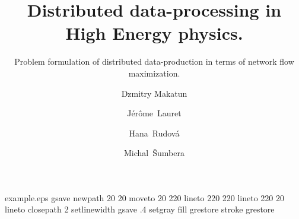 %
%
%
%
%
%
\begin{filecontents*}{example.eps}
gsave
newpath
  20 20 moveto
  20 220 lineto
  220 220 lineto
  220 20 lineto
closepath
2 setlinewidth
gsave
  .4 setgray fill
grestore
stroke
grestore
\end{filecontents*}
%
\documentclass{svjour3}                     %
%
\smartqed  %
%
\usepackage{graphicx}
%
%
%
%
%


\title{Distributed data-processing in High Energy physics.}

\subtitle{Problem formulation of distributed data-production in terms of network flow maximization.}

\author{Dzmitry Makatun         \and
		J\'er\^ome~Lauret		\and
		Hana~Rudov\'a			\and
		Michal~\v{S}umbera	
}

